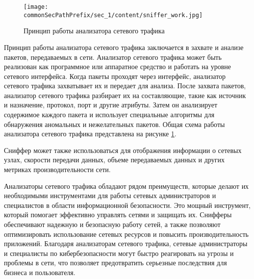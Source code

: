 \begin{figure}[h!]
    \centering
    \texttt{[image: \\commonSecPathPrefix/sec\_1/content/sniffer\_work.jpg]}
    \caption{Принцип работы анализатора сетевого трафика}
    \label{fig:snifwork}
\end{figure}



Принцип работы анализатора сетевого трафика заключается в захвате и
анализе пакетов, передаваемых в сети. Анализатор сетевого трафика может быть
реализован как программное или аппаратное средство и работать на уровне
сетевого интерфейса. Когда пакеты проходят через интерфейс, анализатор
сетевого трафика захватывает их и передает для анализа. После захвата пакетов,
анализатор сетевого трафика разбирает их на составляющие, такие как источник
и назначение, протокол, порт и другие атрибуты. Затем он анализирует
содержимое каждого пакета и использует специальные алгоритмы для
обнаружения аномальных и нежелательных пакетов\cite{unix_man}. Общая схема работы
анализатора сетевого трафика представлена на рисунке \ref{fig:snifwork}.


Сниффер может также использоваться для отображения информации о
сетевых узлах, скорости передачи данных, объеме передаваемых данных и
других метриках производительности сети.


Анализаторы сетевого трафика обладают рядом преимуществ, которые
делают их необходимыми инструментами для работы сетевых администраторов
и специалистов в области информационной безопасности. Это мощный
инструмент, который помогает эффективно управлять сетями и защищать их.
Снифферы обеспечивают надежную и безопасную работу сетей, а также
позволяют оптимизировать использование сетевых ресурсов и повысить
производительность приложений. Благодаря анализаторам сетевого трафика,
сетевые администраторы и специалисты по кибербезопасности могут быстро
реагировать на угрозы и проблемы в сети, что позволяет предотвратить
серьезные последствия для бизнеса и пользователя.

